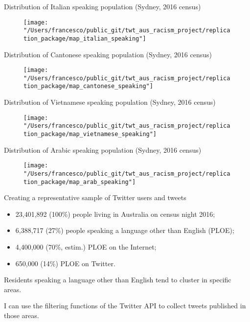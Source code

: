 \documentclass[serif, aspectratio=169]{beamer}
\begin{document}
\begin{frame}
{Distribution of Italian speaking population (Sydney, 2016 census)}

\begin{figure}
\texttt{[image: "/Users/francesco/public\_git/twt\_aus\_racism\_project/replication\_package/map\_italian\_speaking"]}
\end{figure}

\end{frame}

\begin{frame}
{Distribution of Cantonese speaking population (Sydney, 2016 census)}

\begin{figure}
\texttt{[image: "/Users/francesco/public\_git/twt\_aus\_racism\_project/replication\_package/map\_cantonese\_speaking"]}
\end{figure}

\end{frame}

\begin{frame}
{Distribution of Vietnamese speaking population (Sydney, 2016 census)}

\begin{figure}
\texttt{[image: "/Users/francesco/public\_git/twt\_aus\_racism\_project/replication\_package/map\_vietnamese\_speaking"]}
\end{figure}

\end{frame}

\begin{frame}
{Distribution of Arabic speaking population (Sydney, 2016 census)}

\begin{figure}
\texttt{[image: "/Users/francesco/public\_git/twt\_aus\_racism\_project/replication\_package/map\_arab\_speaking"]}
\end{figure}

\end{frame}

\begin{frame}
{Creating a representative sample of Twitter users and tweets}

\begin{itemize}
\item 23,401,892 (100\%) people living in Australia on census night 2016;
\item 6,388,717 (27\%) people speaking a language other than English (PLOE);
\item 4,400,000 (70\%, estim.) PLOE on the Internet;
\item 650,000 (14\%) PLOE on Twitter.
\end{itemize}

Residents speaking a language other than English tend to cluster in specific areas.

I can use the filtering functions of the Twitter API to collect tweets published in those areas.  

\end{frame}
\end{document}
